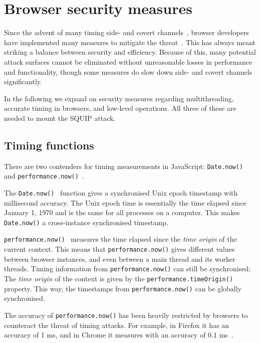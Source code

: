 \documentclass[11pt,
  titlepage=false,
]{scrreprt}
\begin{document}
\section{Browser security measures}
\label{sec:browsersecurity}
Since the advent of many timing side- and covert channels~\cite{noack2018exploiting, Rokicki2022webport, gruss2016rowhammer, 185126},
browser developers have implemented many measures to mitigate the threat~\cite{shusterman2021prime, performancenow, performancenowchrome, schwarz2018javascript}.
This has always meant striking a balance between security and efficiency.
Because of this, many potential attack surfaces cannot be eliminated without unreasonable losses in performance and functionality,
though some measures do slow down side- and covert channels significantly.

In the following we expand on security measures regarding multithreading, accurate timing in browsers, and low-level operations.
All three of these are needed to mount the SQUIP attack.


\subsection{Timing functions}\label{subsec:timingjs}
There are two contenders for timing measurements in JavaScript: \texttt{Date.now()}~\cite{datenow} and \texttt{performance.now()}~\cite{performancenow}.

The \texttt{Date.now()}~\cite{datenow} function gives a synchronised Unix epoch timestamp with millisecond accuracy.
The Unix epoch time is essentially the time elapsed since January 1, 1970 and is the same for all processes on a computer.
This makes \texttt{Date.now()} a cross-instance synchronised timestamp.

\texttt{performance.now()}~\cite{performancenow} measures the time elapsed since the \textit{time origin} of the current context.
This means that \texttt{performance.now()} gives different values between browser instances, and even between a main thread and its worker threads.
Timing information from \texttt{performance.now()} can still be synchronised;
The \textit{time origin} of the context is given by the \texttt{performance.timeOrigin()}~\cite{performancetimeorigin} property.
This way, the timestamps from \texttt{performance.now()} can be globally synchronised.

The accuracy of \texttt{performance.now()} has been heavily restricted by browsers to counteract the threat of timing attacks.
For example, in Firefox it has an accuracy of 1 ms, and in Chrome it measures with an accuracy of 0.1 ms~\cite{performancenow, performancenowchrome}.
\end{document}
